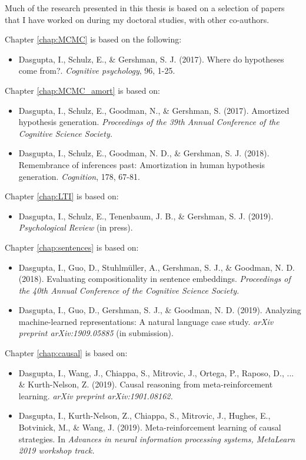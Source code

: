
Much of the research presented in this thesis is based on a selection of papers that I have worked on during my doctoral studies, with other co-authors.

{\setlength{\parindent}{0cm}

Chapter \ref{chap:MCMC} is based on the following:
\begin{itemize}
\setlength{\itemindent}{-1.5em}
\item Dasgupta, I., Schulz, E., \& Gershman, S. J. (2017). Where do hypotheses come from?. \textit{Cognitive psychology}, 96, 1-25.
\end{itemize}

Chapter \ref{chap:MCMC_amort} is based on:
\begin{itemize}
\setlength{\itemindent}{-1.5em}
\item Dasgupta, I., Schulz, E., Goodman, N., \& Gershman, S. (2017). Amortized hypothesis generation. \textit{Proceedings of the 39th Annual Conference of the Cognitive Science Society.} 
\item Dasgupta, I., Schulz, E., Goodman, N. D., \& Gershman, S. J. (2018). Remembrance of inferences past: Amortization in human hypothesis generation. \textit{Cognition}, 178, 67-81.
\end{itemize}

Chapter \ref{chap:LTI} is based on:
\begin{itemize}
\setlength{\itemindent}{-1.5em}
\item Dasgupta, I., Schulz, E., Tenenbaum, J. B., \& Gershman, S. J. (2019). \textit{Psychological Review} (in press).
\end{itemize}

Chapter \ref{chap:sentences} is based on:
\begin{itemize}
\setlength{\itemindent}{-1.5em}
\item Dasgupta, I., Guo, D., Stuhlmüller, A., Gershman, S. J., \& Goodman, N. D. (2018). Evaluating compositionality in sentence embeddings. \textit{Proceedings of the 40th Annual Conference of the Cognitive Science Society.} 
\item Dasgupta, I., Guo, D., Gershman, S. J., \& Goodman, N. D. (2019). Analyzing machine-learned representations: A natural language case study. \textit{arXiv preprint arXiv:1909.05885} (in submission).
\end{itemize}

 Chapter \ref{chap:causal} is based on:
\begin{itemize}
\setlength{\itemindent}{-1.5em}
\item Dasgupta, I., Wang, J., Chiappa, S., Mitrovic, J., Ortega, P., Raposo, D., ... \& Kurth-Nelson, Z. (2019). Causal reasoning from meta-reinforcement learning. \textit{arXiv preprint arXiv:1901.08162.} 
\item Dasgupta, I., Kurth-Nelson, Z., Chiappa, S., Mitrovic, J., Hughes, E., Botvinick, M., \& Wang, J. (2019). Meta-reinforcement learning of causal strategies.  In \textit{Advances in neural information processing systems, MetaLearn 2019 workshop track.}
\end{itemize}
}



